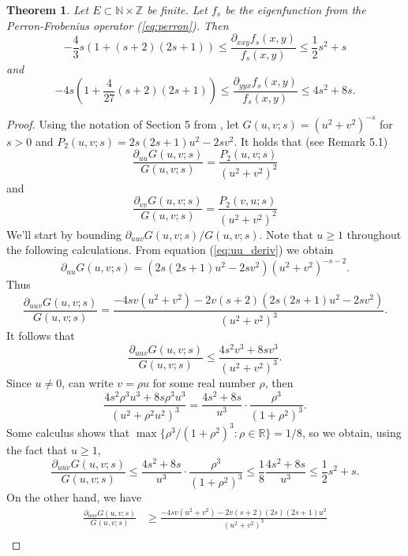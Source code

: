 \documentclass[10pt]{article}
\newtheorem{theorem}{Theorem}[section]
\theoremstyle{definition}
\numberwithin{equation}{section}
\numberwithin{figure}{section}
\numberwithin{table}{section}
\begin{document}
\begin{theorem}
Let $E\subset\mathbb{N}\times\mathbb{Z}$ be finite. Let $f_s$ be the eigenfunction from the Perron-Frobenius operator (\ref{eq:perron}). Then
\begin{equation}
-\frac{4}{3}s(1+(s+2)(2s+1))\leq\frac{\partial_{xxy}f_s(x,y)}{f_s(x,y)}\leq\frac{1}{2}s^2+s
\label{eq:xxy_deriv}
\end{equation}
and
\begin{equation}
-4s\left(1+\frac{4}{27}(s+2)(2s+1)\right)\leq\frac{\partial_{yyx}f_s(x,y)}{f_s(x,y)}\leq4s^2+8s.
\label{eq:yyx_deriv}
\end{equation}
\label{thm:third_bounds}
\end{theorem}
\begin{proof}
Using the notation of Section 5 from \cite{falk2018new}, let $G(u,v;s)=(u^2+v^2)^{-s}$ for $s>0$ and $P_2(u,v;s)=2s(2s+1)u^2-2sv^2$. It holds that (see Remark 5.1)
\begin{equation}
\frac{\partial_{uu}G(u,v;s)}{G(u,v;s)}=\frac{P_2(u,v;s)}{(u^2+v^2)^2}
\label{eq:uu_deriv}
\end{equation}
and
\begin{equation}
\frac{\partial_{vv}G(u,v;s)}{G(u,v;s)}=\frac{P_2(v,u;s)}{(u^2+v^2)^2}
\label{eq:vv_deriv}
\end{equation}
We'll start by bounding $\partial_{uuv}G(u,v;s)/G(u,v;s)$. Note that $u\geq 1$ throughout the following calculations. From equation (\ref{eq:uu_deriv}) we obtain
$$\partial_{uu}G(u,v;s)=(2s(2s+1)u^2-2sv^2)(u^2+v^2)^{-s-2}.$$
Thus
\begin{equation*}
\frac{\partial_{uuv}G(u,v;s)}{G(u,v;s)}=\frac{-4sv(u^2+v^2)-2v(s+2)(2s(2s+1)u^2-2sv^2)}{(u^2+v^2)^3}.
\label{eq:Guuv}
\end{equation*}
It follows that 
$$\frac{\partial_{uuv}G(u,v;s)}{G(u,v;s)}\leq\frac{4s^2v^3+8sv^3}{(u^2+v^2)^3}.$$
Since $u\neq0$, can write $v=\rho u$ for some real number $\rho$, then
$$\frac{4s^2\rho^3u^3+8s\rho^3u^3}{(u^2+\rho^2u^2)^3}=\frac{4s^2+8s}{u^3}\cdot\frac{\rho^3}{(1+\rho^2)^3}.$$
Some calculus shows that $\max\{\rho^3/(1+\rho^2)^3:\rho\in\mathbb{R}\}=1/8$, so we obtain, using the fact that $u\geq1$,
\begin{equation}
\frac{\partial_{uuv}G(u,v;s)}{G(u,v;s)}\leq\frac{4s^2+8s}{u^3}\cdot\frac{\rho^3}{(1+\rho^2)^3}\leq\frac{1}{8}\frac{4s^2+8s}{u^3}\leq\frac{1}{2}s^2+s.
\label{eq:uuv_upper}
\end{equation}
On the other hand, we have
\begin{align*}
\frac{\partial_{uuv}G(u,v;s)}{G(u,v;s)}&\geq\frac{-4sv(u^2+v^2)-2v(s+2)(2s)(2s+1)u^2}{(u^2+v^2)^3}\\

\end{align*}
\end{proof}
\end{document}
